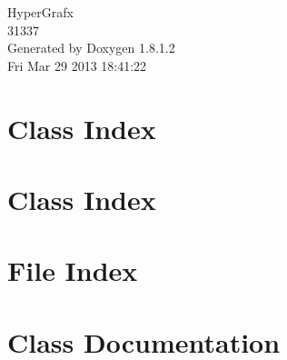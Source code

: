 \documentclass{book}
\begin{document}
\hypersetup{pageanchor=false,citecolor=blue}
\begin{titlepage}
\vspace*{7cm}
\begin{center}
{\Large Hyper\-Grafx \\[1ex]\large 31337 }\\
\vspace*{1cm}
{\large Generated by Doxygen 1.8.1.2}\\
\vspace*{0.5cm}
{\small Fri Mar 29 2013 18:41:22}\\
\end{center}
\end{titlepage}
\clearemptydoublepage
{}
\tableofcontents
\clearemptydoublepage
{}
\hypersetup{pageanchor=true,citecolor=blue}
\chapter{Class Index}

\chapter{Class Index}

\chapter{File Index}

\chapter{Class Documentation}
























\end{document}
